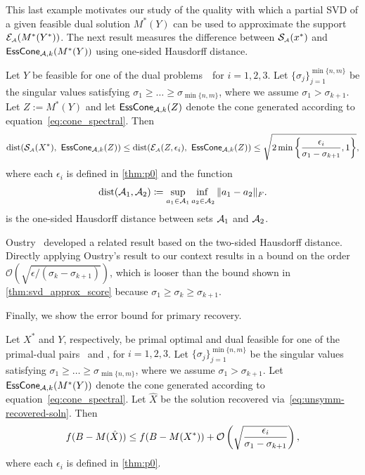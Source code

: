 This last example motivates our study of the quality with which a partial SVD of a given feasible dual solution $M^*(Y)$ can be used to approximate the support $\mathcal{E}_{\scriptscriptstyle\mathcal{A}}(M^*(Y^*))$. The next result measures the difference between $\operatorname{\mathcal{S}_{\scriptscriptstyle\mathcal{A}}}(x^*)$ and $\operatorname{\sf EssCone}_{\mathcal{A}, k}(M^*(Y))$ using one-sided Hausdorff distance.

\begin{proposition} \label{thm:svd_approx_score}
  Let $Y$ be feasible for one of the dual problems~\Drobi\ for $i=1,2,3$.
Let $\{\sigma_j\}_{j=1}^{\min\{n,m\}}$ be the singular values satisfying 
$\sigma_1 \geq \dots \geq \sigma_{\min\{n,m\}}$, where we assume $\sigma_1 > \sigma_{k+1}$. Let $Z:=M^*(Y)$ and let $\operatorname{\sf EssCone}_{\mathcal{A}, k}(Z)$ denote the cone generated according to equation~\eqref{eq:cone_spectral}. Then 
  \[
    \operatorname{dist}( \operatorname{\mathcal{S}_{\scriptscriptstyle\mathcal{A}}}(X^*),\  \operatorname{\sf EssCone}_{\mathcal{A}, k}(Z)) \leq
    \operatorname{dist}( \mathcal{E}_{\scriptscriptstyle\mathcal{A}}( Z, \epsilon_i ),\ \operatorname{\sf EssCone}_{\mathcal{A}, k}(Z)  ) \leq \sqrt{ 2 \min\left\{ \frac{\epsilon_i}{ \sigma_1 - \sigma_{k+1} }, 1 \right\} },
  \]
  where each $\epsilon_i$ is defined in \autoref{thm:p0} and the function 
  \[  
  \dist( \Ascr_1, \Ascr_2 ) \coloneqq \adjustlimits\sup_{a_1 \in \Ascr_1} \inf_{a_2 \in \Ascr_2 } \| a_1 - a_2 \|_F.
    \]
  is the one-sided Hausdorff distance between sets $\mathcal{A}_1$ and $\mathcal{A}_2$.
\end{proposition}

Oustry~\cite[Theorem~2.11]{Oustry00} developed a related result based on the two-sided Hausdorff distance. Directly applying Oustry's result to our context results in a bound on the order $ \mathcal{O}( \sqrt{ \epsilon/( \sigma_k - \sigma_{k+1} ) } ) $, which is looser than the bound shown in \autoref{thm:svd_approx_score} because $\sigma_1 \geq \sigma_{k} \geq \sigma_{k+1}$. 

Finally, we show the error bound for primary recovery. 
\begin{proposition} \label{prop:spectral}
     Let $X^*$ and $Y$, respectively, be primal optimal and dual feasible for one of the primal-dual pairs \Probi\ and \Drobi, for $i=1,2,3$.
Let $\{\sigma_j\}_{j=1}^{\min\{n,m\}}$ be the singular values satisfying 
$\sigma_1 \geq \dots \geq \sigma_{\min\{n,m\}}$, where we assume $\sigma_1 > \sigma_{k+1}$.  Let $\operatorname{\sf EssCone}_{\mathcal{A}, k}(M^*(Y))$ denote the cone generated according to equation~\eqref{eq:cone_spectral}. Let $\hat X$ be the solution recovered via~\eqref{eq:unsymm-recovered-soln}.
Then
\[
    f( B - M (\hat X )) \le f( B - M (X^*) ) + \mathcal{O}\left( \sqrt{ \frac{\epsilon_i}{ \sigma_1 - \sigma_{k+1} } } \right),
\]
where each $\epsilon_i$ is defined in \autoref{thm:p0}.
\end{proposition}

